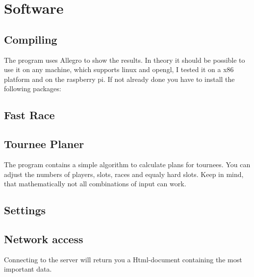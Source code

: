 \documentclass[11pt, a4paper, UKenglish, parskip=half+]{scrbook}
\begin{document}
\chapter{Software}
\section{Compiling}
The program uses Allegro to show the results. In theory it should be possible to use it on any machine, which supports linux and opengl, I tested it on a x86 platform and on the raspberry pi. If not already done you have to install the following packages:
\section{Fast Race}

\section{Tournee Planer}
The program contains a simple algorithm to calculate plans for tournees. You can adjust the numbers of players, slots, races and equaly hard slots. Keep in mind, that mathematically not all combinations of input can work.
\section{Settings}
\section{Network access}
Connecting to the server will return you a Html-document containing the most important data.
\end{document}
